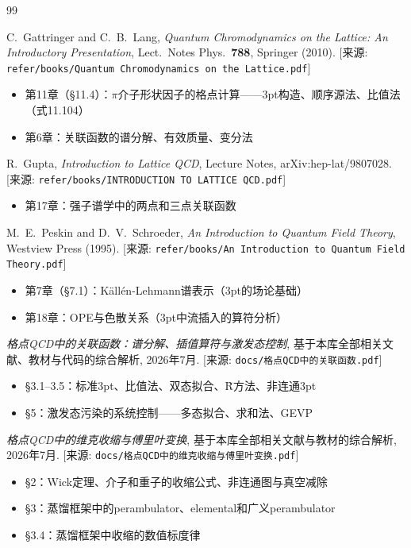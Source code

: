\documentclass[12pt,a4paper]{ctexart}
\theoremstyle{definition}
\begin{document}
\begin{thebibliography}{99}

C.~Gattringer and C.~B.~Lang,
\textit{Quantum Chromodynamics on the Lattice: An Introductory Presentation},
Lect.\ Notes Phys.\ \textbf{788}, Springer (2010).
[来源: \texttt{refer/books/Quantum Chromodynamics on the Lattice.pdf}]
\begin{itemize}
    \item 第11章（§11.4）：$\pi$介子形状因子的格点计算——3pt构造、顺序源法、比值法（式11.104）
    \item 第6章：关联函数的谱分解、有效质量、变分法
\end{itemize}

R.~Gupta,
\textit{Introduction to Lattice QCD},
Lecture Notes, arXiv:hep-lat/9807028.
[来源: \texttt{refer/books/INTRODUCTION TO LATTICE QCD.pdf}]
\begin{itemize}
    \item 第17章：强子谱学中的两点和三点关联函数
\end{itemize}

M.~E.~Peskin and D.~V.~Schroeder,
\textit{An Introduction to Quantum Field Theory},
Westview Press (1995).
[来源: \texttt{refer/books/An Introduction to Quantum Field Theory.pdf}]
\begin{itemize}
    \item 第7章（§7.1）：K\"all\'en-Lehmann谱表示（3pt的场论基础）
    \item 第18章：OPE与色散关系（3pt中流插入的算符分析）
\end{itemize}

\textit{格点QCD中的关联函数：谱分解、插值算符与激发态控制},
基于本库全部相关文献、教材与代码的综合解析, 2026年7月.
[来源: \texttt{docs/格点QCD中的关联函数.pdf}]
\begin{itemize}
    \item §3.1--3.5：标准3pt、比值法、双态拟合、R̃方法、非连通3pt
    \item §5：激发态污染的系统控制——多态拟合、求和法、GEVP
\end{itemize}

\textit{格点QCD中的维克收缩与傅里叶变换},
基于本库全部相关文献与教材的综合解析, 2026年7月.
[来源: \texttt{docs/格点QCD中的维克收缩与傅里叶变换.pdf}]
\begin{itemize}
    \item §2：Wick定理、介子和重子的收缩公式、非连通图与真空减除
    \item §3：蒸馏框架中的perambulator、elemental和广义perambulator
    \item §3.4：蒸馏框架中收缩的数值标度律
\end{itemize}


\end{thebibliography}
\end{document}
